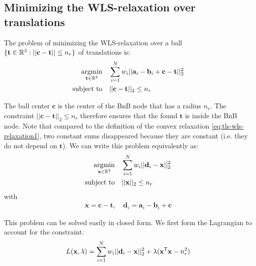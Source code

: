 \subsection{Minimizing the WLS-relaxation over translations}

The problem of minimizing the WLS-relaxation over a ball $\{ \mathbf{t} \in \mathbb{R}^3 : || \mathbf{c} - \mathbf{t} || \leq n_r \}$ of translations is:
\begin{equation}
	\label{eq:tls-twls-constrained}
	\begin{aligned}
		\operatorname*{argmin}_{\mathbf{t} \in \mathbb{R}^3} \quad &\sum_{i=1}^{N} w_i ||\mathbf{a}_i - \mathbf{b}_i + \mathbf{c} - \mathbf{t}||_2^2 \\
		\text{subject to} \quad  &||\mathbf{c} - \mathbf{t}||_2 \leq n_r
	\end{aligned}
\end{equation}

The ball center $\mathbf{c}$ is the center of the BnB node that has a radius $n_r$. 
The constraint $||\mathbf{c} - \mathbf{t}||_2 \leq n_r$ therefore ensures  that the found $\mathbf{t}$ is inside the BnB node. Note that compared to the definition of the convex relaxation \ref{eq:tls-wls-relaxation1}, two constant sums disappeared because they are constant (i.e. they do not depend on $\mathbf{t}$). 
We can write this problem equivalently as:
\begin{equation}
	\label{eq:tls-twls-constrained}
	\begin{aligned}
		\operatorname*{argmin}_{\mathbf{x} \in \mathbb{R}^3} \quad &\sum_{i=1}^{N} w_i ||\mathbf{d}_i - \mathbf{x}||_2^2 \\
		\text{subject to} \quad  &||\mathbf{x}||_2 \leq n_r
	\end{aligned}
\end{equation}
with 
\begin{equation}
	\begin{aligned}
		\mathbf{x} = \mathbf{c} - \mathbf{t}, \quad \mathbf{d}_i = \mathbf{a}_i - \mathbf{b}_i + \mathbf{c}
	\end{aligned}
\end{equation}

This problem can be solved easily in closed form.
We first form the Lagrangian to account for the constraint:
\begin{equation}
	\begin{aligned}	
		L(\mathbf{x}, \lambda) =  \sum_{i=1}^{N} w_i ||\mathbf{d}_i - \mathbf{x}||_2^2 + \lambda (
		\mathbf{x}^{\mathsf{T}} \mathbf{x} - n_r^2)\\
	\end{aligned}
\end{equation}

